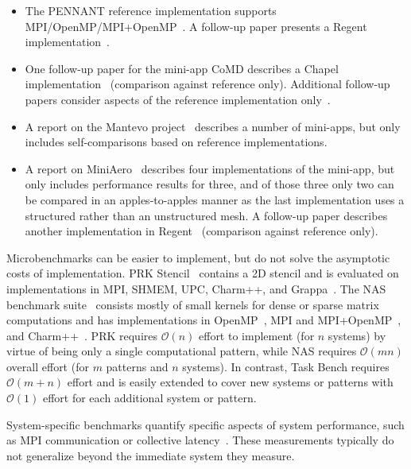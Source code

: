 \begin{itemize}

\item
The PENNANT reference implementation supports
MPI/OpenMP/MPI+OpenMP~\cite{PENNANT}. A follow-up paper presents a
Regent implementation~\cite{Regent15}.

\item
One follow-up paper for the mini-app CoMD describes a Chapel
implementation~\cite{CoMDChapel16} (comparison against reference
only). Additional follow-up papers consider aspects of the reference
implementation only~\cite{CoMDLoadImbalance17,
  CoMDThreadedModels14}.

\item
A report on the Mantevo project~\cite{Mantevo09} describes a number of
mini-apps, but only includes self-comparisons based on reference
implementations.

\item
A report on MiniAero~\cite{SandiaReportManyTaskRuntimes15} describes
four implementations of the mini-app, but only includes performance
results for three, and of those three only two can be compared in an
apples-to-apples manner as the last implementation uses a structured
rather than an unstructured mesh. A follow-up paper describes another
implementation in Regent~\cite{Regent15} (comparison against reference
only).

\end{itemize}

Microbenchmarks can be easier to implement, but do not solve the
asymptotic costs of implementation. PRK Stencil~\cite{PRK14} contains a
2D stencil and is evaluated on implementations in MPI, SHMEM, UPC,
Charm++, and Grappa~\cite{PRKRuntimes16}. The NAS benchmark
suite~\cite{NAS91, NAS95} consists mostly of small kernels for dense
or sparse matrix computations and has implementations in
OpenMP~\cite{NASOpenMP99}, MPI and MPI+OpenMP~\cite{NASMPIOpenMP00},
and Charm++~\cite{NASCharm96}. PRK requires $\mathcal{O}(n)$ effort to
implement (for $n$ systems) by virtue of being only a single
computational pattern, while NAS requires $\mathcal{O}(mn)$ overall
effort (for $m$ patterns and $n$ systems). In contrast, Task Bench
requires $\mathcal{O}(m+n)$ effort and is easily extended to cover new
systems or patterns with $\mathcal{O}(1)$ effort for each additional
system or pattern.

System-specific benchmarks quantify specific aspects
of system performance, such as MPI communication or collective
latency~\cite{MPPTest99, MPIBench01}. These measurements typically do
not generalize beyond the immediate system they measure.

